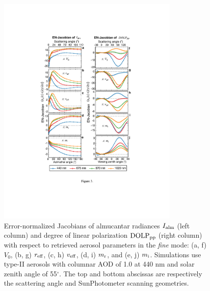 \begin{figure}[p]
  \centering
  \includegraphics[width={0.8\textwidth}]{figures/info03.pdf}
  \caption{Error-normalized Jacobians of almucantar radiances $I_\text{alm}$ (left
column) and degree of linear polarization $\text{DOLP}_\text{pp}$ (right column) with respect
to retrieved aerosol parameters in the \textit{fine} mode: (a, f) $V_0$, (b, g)
$r_\text{eff}$, (c, h) $v_\text{eff}$, (d, i) $m_\text{r}$, and (e, j) $m_\text{i}$. Simulations use
type-II aerosols with columnar AOD of 1.0 at 440 nm and solar zenith angle of 
55$^\circ$. The top and bottom abscissas are respectively the scattering angle
and SunPhotometer scanning geometries.}
  \label{fig:infoenjf}
\end{figure}

